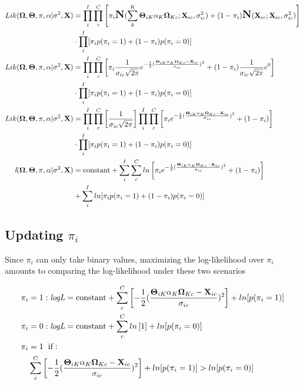 \begin{align}
Lik(\mathbf{\Omega}, \mathbf{\Theta}, \pi, \alpha | \sigma^{2}, \textbf{X}) &= \prod_{i}^{I}\prod_{c}^{C}\left[ \pi_{i}\mbox{\Large \textbf{N}}(\sum_{k}^{K}\mathbf{\Theta}_{iK}\alpha_{K}\mathbf{\Omega}_{Kc} ; \textbf{X}_{ic}, \sigma^{2}_{ic}) + (1-\pi_{i})\mbox{\Large \textbf{N}}( \textbf{X}_{ic}; \textbf{X}_{ic}, \sigma^{2}_{ic}) \right] \notag\\
&\cdot \prod_{i}^{I}[\pi_{i}p(\pi_{i} = 1) + (1-\pi_{i})p(\pi_{i} = 0)]\notag\\
Lik(\mathbf{\Omega}, \mathbf{\Theta}, \pi, \alpha | \sigma^{2}, \textbf{X}) &= \prod_{i}^{I}\prod_{c}^{C}\left[\pi_{i}\frac{1}{\sigma_{ic}\sqrt{2\pi}}e^{-\frac{1}{2}(\frac{\mathbf{\Theta}_{iK}\alpha_{K}\mathbf{\Omega}_{Kc} - \textbf{X}_{ic}}{\sigma_{ic}})^2} + (1-\pi_{i})\frac{1}{\sigma_{ic}\sqrt{2\pi}}e^{0}\right]\notag\\
&\cdot \prod_{i}^{I}[\pi_{i}p(\pi_{i} = 1) + (1-\pi_{i})p(\pi_{i} = 0)]\notag\\
Lik(\mathbf{\Omega}, \mathbf{\Theta}, \pi, \alpha | \sigma^{2}, \textbf{X}) &= \prod_{i}^{I}\prod_{c}^{C}\left[\frac{1}{\sigma_{ic}\sqrt{2\pi}} \right] \prod_{i}^{I}\prod_{c}^{C}\left[\pi_{i}e^{-\frac{1}{2}(\frac{\mathbf{\Theta}_{iK}\alpha_{K}\mathbf{\Omega}_{Kc} - \textbf{X}_{ic}}{\sigma_{ic}})^2} + (1-\pi_{i})\right]\notag\\
&\cdot \prod_{i}^{I}[\pi_{i}p(\pi_{i} = 1) + (1-\pi_{i})p(\pi_{i} = 0)]\notag\\
\textit{l}(\mathbf{\Omega}, \mathbf{\Theta}, \pi, \alpha | \sigma^{2}, \textbf{X}) &= \text{constant} + \sum_{i}^{I}\sum_{c}^{C}ln\left[\pi_{i}e^{-\frac{1}{2}(\frac{\mathbf{\Theta}_{iK}\alpha_{K}\mathbf{\Omega}_{Kc} - \textbf{X}_{ic}}{\sigma_{ic}})^2} + (1-\pi_{i})\right]\notag\\
&+ \sum_{i}^{I}ln[\pi_{i}p(\pi_{i} = 1) + (1-\pi_{i})p(\pi_{i} = 0)]\notag\\
\end{align}

\subsection*{Updating $\pi_{i}$}

Since $\pi_{i}$ can only take binary values, maximizing the log-likelihood over $\pi_{i}$ amounts to comparing the log-likelihood under these two scenarios

\begin{align}
\pi_{i} &= 1: \textit{logL} = \text{constant} + \sum_{c}^{C}\left[{-\frac{1}{2}(\frac{\mathbf{\Theta}_{iK}\alpha_{K}\mathbf{\Omega}_{Kc} - \textbf{X}_{ic}}{\sigma_{ic}})^2}\right] + ln[p(\pi_{i} = 1)]\notag\\
\pi_{i} &= 0: \textit{logL} = \text{constant} + \sum_{c}^{C}ln\left[1\right] + ln[p(\pi_{i} = 0)]\notag\\
\pi_{i} &= 1 \hspace{2mm}\text{if}:\notag\\ & \sum_{c}^{C}\left[{-\frac{1}{2}(\frac{\mathbf{\Theta}_{iK}\alpha_{K}\mathbf{\Omega}_{Kc} - \textbf{X}_{ic}}{\sigma_{ic}})^2}\right] + ln[p(\pi_{i} = 1)] > ln[p(\pi_{i} = 0)]
\end{align}

